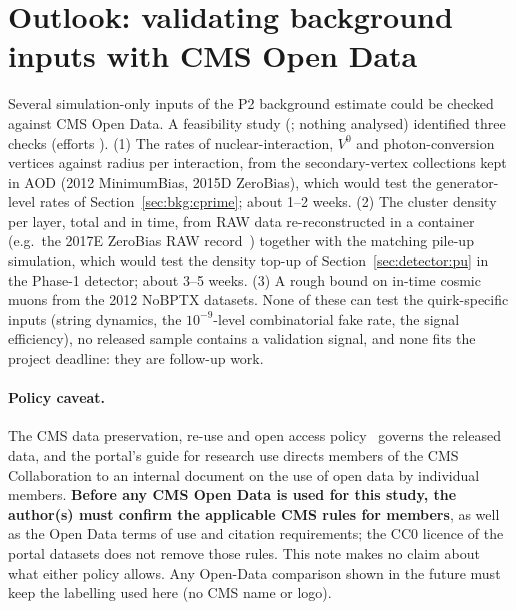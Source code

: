 \section{Outlook: validating background inputs with CMS Open Data}\label{sec:opendata}

Several simulation-only inputs of the P2 background estimate could be checked against CMS Open Data. A feasibility
study (; nothing analysed) identified three checks (efforts \EST{}). (1) The rates of
nuclear-interaction, $V^0$ and photon-conversion vertices against radius per interaction, from the secondary-vertex
collections kept in AOD (2012 MinimumBias, 2015D ZeroBias), which would test the generator-level rates of
Section~\ref{sec:bkg:cprime}; about 1--2 weeks. (2) The cluster density per layer, total and in time, from RAW data
re-reconstructed in a container (e.g.\ the 2017E ZeroBias RAW record~\cite{CMS:ZeroBias2017E}) together with the matching
pile-up simulation, which would test the density top-up of Section~\ref{sec:detector:pu} in the Phase-1 detector; about
3--5 weeks. (3) A rough bound on in-time cosmic muons from the 2012 NoBPTX datasets. None of these can test the
quirk-specific inputs (string dynamics, the $10^{-9}$-level combinatorial fake rate, the signal efficiency), no released
sample contains a validation signal, and none fits the project deadline: they are follow-up work.

\paragraph{Policy caveat.} The CMS data preservation, re-use and open access policy~\cite{CMS:OpenDataPolicy2018} governs
the released data, and the portal's guide for research use directs members of the CMS Collaboration to an internal
document on the use of open data by individual members. \textbf{Before any CMS Open Data is used for this study, the
author(s) must confirm the applicable CMS rules for members}, as well as the Open Data terms of use and citation
requirements; the CC0 licence of the portal datasets does not remove those rules. This note makes no claim about what
either policy allows. Any Open-Data comparison shown in the future must keep the labelling used here (no CMS name or
logo).
